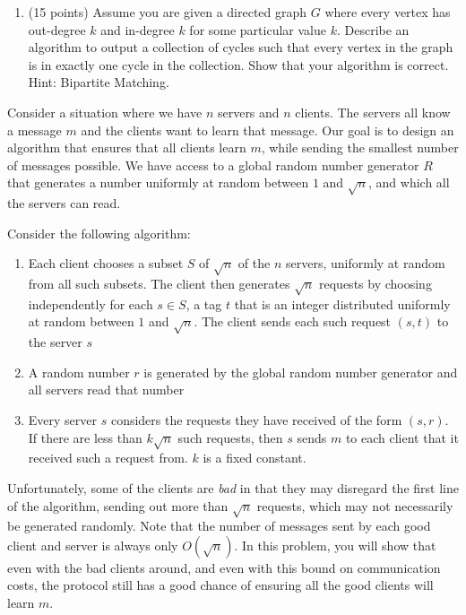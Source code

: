 \documentclass[11pt]{article}
\begin{document}
\begin{enumerate}
\begin{enumerate}
 
 \pagebreak
 
 
 \item (15 points) Assume you are given a directed graph $G$ where every vertex has out-degree $k$ and in-degree $k$ for some particular value $k$.  Describe an algorithm to output a collection of cycles such that every vertex in the graph is in exactly one cycle in the collection.  Show that your algorithm is correct.  Hint: Bipartite Matching.


\end{enumerate}




Consider a situation where we have $n$ servers and $n$ clients.  The servers all know a message $m$ and the clients want to learn that message.  Our goal is to design an algorithm that ensures that all clients learn $m$, while sending the smallest number of messages possible.  We have access to a global random number generator $R$ that generates a number uniformly at random between $1$ and $\sqrt{n}$, and which all the servers can read.

Consider the following algorithm:

\begin{enumerate}
\item Each client chooses a subset $S$ of $\sqrt{n}$ of the $n$ servers, uniformly at random from all such subsets.  The client then generates $\sqrt{n}$ requests by choosing independently for each $s \in S$, a tag $t$ that is an integer distributed uniformly at random between $1$ and $\sqrt{n}$.  The client sends each such request $(s,t)$ to the server $s$
\item A random number $r$ is generated by the global random number generator and all servers read that number
\item Every server $s$ considers the requests they have received of the form $(s,r)$.  If there are less than $k \sqrt{n}$ such requests, then $s$ sends $m$ to each client that it received such a request from.  $k$ is a fixed constant.
\end{enumerate}

Unfortunately, some of the clients are \emph{bad} in that they may disregard the first line of the algorithm, sending out more than $\sqrt{n}$ requests, which may not necessarily be generated randomly.  Note that the number of messages sent by each good client and server is always only $O(\sqrt{n})$.  In this problem, you will show that even with the bad clients around, and even with this bound on communication costs, the protocol still has a good chance of ensuring all the good clients will learn $m$.


\end{enumerate}
\end{document}
